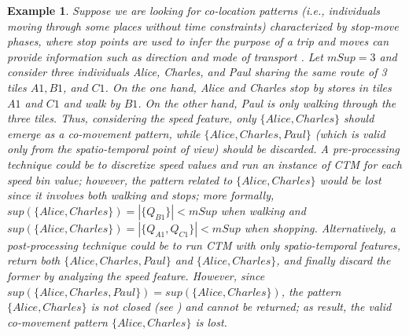 \documentclass[preprint,12pt,authoryear]{elsarticle} %
\newtheorem{example}{Example}
\begin{document}
\begin{example}
Suppose we are looking for co-location patterns (i.e., individuals moving through some places without time constraints) characterized by stop-move phases, where stop points are used to infer the purpose of a trip and moves can provide information such as direction and mode of transport \citep{DBLP:journals/tgis/WangM18}.
Let $mSup=3$ and consider three individuals Alice, Charles, and Paul sharing the same route of 3 tiles $A1,B1$, and $C1$.
On the one hand, Alice and Charles stop by stores in tiles $A1$ and $C1$ and walk by $B1$. On the other hand, Paul is only walking through the three tiles. Thus, considering the speed feature, only $\{Alice, Charles\}$ should emerge as a co-movement pattern, while $\{Alice, Charles, Paul\}$ (which is valid only from the spatio-temporal point of view) should be discarded.
A pre-processing technique could be to discretize speed values and run an instance of CTM for each speed bin value; however, the pattern related to $\{Alice, Charles\}$ would be lost since it involves \textit{both} walking and stops; more formally, $sup(\{Alice, Charles\})=|\{Q_{B1}\}|<mSup$ when walking and $sup(\{Alice, Charles\})=|\{Q_{A1},Q_{C1}\}|<mSup$ when shopping.
Alternatively, a post-processing technique could be to run CTM with only spatio-temporal features, return both $\{Alice, Charles, Paul\}$ and $\{Alice, Charles\}$, and finally discard the former by analyzing the speed feature. However, since $sup(\{Alice, Charles, Paul\})=sup(\{Alice, Charles\})$, the pattern $\{Alice, Charles\}$ is not closed (see ) and cannot be returned; as result, the valid co-movement pattern $\{Alice, Charles\}$ is lost.
\end{example}
\end{document}
